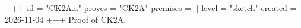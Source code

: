+++
id = "CK2A.a"
proves = "CK2A"
premises = []
level = "sketch"
created = 2026-11-04
+++
Proof of CK2A.
